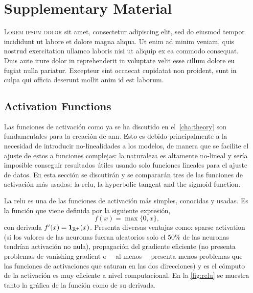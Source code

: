 

\chapter{Supplementary Material}\label{cha:extra}



\lettrine{L}{orem ipsum dolor} sit amet, consectetur adipiscing elit, sed do
eiusmod tempor incididunt ut labore et dolore magna aliqua. Ut enim ad minim
veniam, quis nostrud exercitation ullamco laboris nisi ut aliquip ex ea commodo
consequat. Duis aute irure dolor in reprehenderit in voluptate velit esse
cillum dolore eu fugiat nulla pariatur. Excepteur sint occaecat cupidatat non
proident, sunt in culpa qui officia deserunt mollit anim id est laborum.



\section{Activation Functions}

Las funciones de activación como ya se ha discutido en el\ \vref{cha:theory}
son fundamentales para la creación de \gls{ann}. Esto es debido principalmente
a la necesidad de introducir no-linealidades a los modelos, de manera que se
facilite el ajuste de estos a funciones complejas: la naturaleza es altamente
no-lineal y sería imposible conseguir resultados útiles usando solo funciones
lineales para el ajuste de datos. En esta sección se discutirán y se compararán
tres de las funciones de activación más usadas: la \gls{relu}, la hyperbolic
tangent and the sigmoid function.

La \gls{relu} es una de las funciones de activación más simples, conocidas y
usadas. Es la función que viene definida por la siguiente expresión,
\begin{equation}
  f(x) = \max\{0, x\},
\end{equation}
con derivada \(f^\prime(x) = \mathbf{1}_{\mathbb{R}^+}(x)\). Presenta diversas ventajas
como: sparse activation (si los valores de las neuronas fueran aleatorios solo
el 50\% de las neuronas tendrían activación no nula), propagación del gradiente
eficiente (no presenta problemas de vanishing gradient o ---al menos---
presenta menos problemas que las funciones de activaciones que saturan en las
dos direcciones) y es el cómputo de la activación es muy eficiente a nivel
computacional. En la \vref{fig:relu} se muestra tanto la gráfica de la función
como de su derivada.

